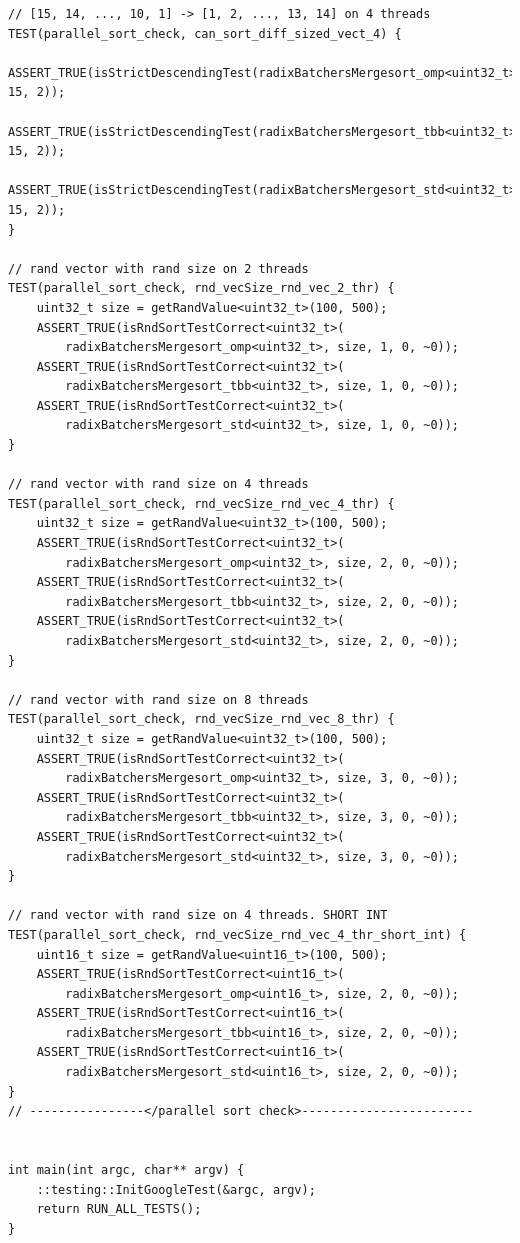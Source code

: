 \documentclass{report}
\begin{document}
\begin{lstlisting}
// [15, 14, ..., 10, 1] -> [1, 2, ..., 13, 14] on 4 threads
TEST(parallel_sort_check, can_sort_diff_sized_vect_4) {
    ASSERT_TRUE(isStrictDescendingTest(radixBatchersMergesort_omp<uint32_t>, 15, 2));
    ASSERT_TRUE(isStrictDescendingTest(radixBatchersMergesort_tbb<uint32_t>, 15, 2));
    ASSERT_TRUE(isStrictDescendingTest(radixBatchersMergesort_std<uint32_t>, 15, 2));
}

// rand vector with rand size on 2 threads
TEST(parallel_sort_check, rnd_vecSize_rnd_vec_2_thr) {
    uint32_t size = getRandValue<uint32_t>(100, 500);
    ASSERT_TRUE(isRndSortTestCorrect<uint32_t>(
        radixBatchersMergesort_omp<uint32_t>, size, 1, 0, ~0));
    ASSERT_TRUE(isRndSortTestCorrect<uint32_t>(
        radixBatchersMergesort_tbb<uint32_t>, size, 1, 0, ~0));
    ASSERT_TRUE(isRndSortTestCorrect<uint32_t>(
        radixBatchersMergesort_std<uint32_t>, size, 1, 0, ~0));
}

// rand vector with rand size on 4 threads
TEST(parallel_sort_check, rnd_vecSize_rnd_vec_4_thr) {
    uint32_t size = getRandValue<uint32_t>(100, 500);
    ASSERT_TRUE(isRndSortTestCorrect<uint32_t>(
        radixBatchersMergesort_omp<uint32_t>, size, 2, 0, ~0));
    ASSERT_TRUE(isRndSortTestCorrect<uint32_t>(
        radixBatchersMergesort_tbb<uint32_t>, size, 2, 0, ~0));
    ASSERT_TRUE(isRndSortTestCorrect<uint32_t>(
        radixBatchersMergesort_std<uint32_t>, size, 2, 0, ~0));
}

// rand vector with rand size on 8 threads
TEST(parallel_sort_check, rnd_vecSize_rnd_vec_8_thr) {
    uint32_t size = getRandValue<uint32_t>(100, 500);
    ASSERT_TRUE(isRndSortTestCorrect<uint32_t>(
        radixBatchersMergesort_omp<uint32_t>, size, 3, 0, ~0));
    ASSERT_TRUE(isRndSortTestCorrect<uint32_t>(
        radixBatchersMergesort_tbb<uint32_t>, size, 3, 0, ~0));
    ASSERT_TRUE(isRndSortTestCorrect<uint32_t>(
        radixBatchersMergesort_std<uint32_t>, size, 3, 0, ~0));
}

// rand vector with rand size on 4 threads. SHORT INT
TEST(parallel_sort_check, rnd_vecSize_rnd_vec_4_thr_short_int) {
    uint16_t size = getRandValue<uint16_t>(100, 500);
    ASSERT_TRUE(isRndSortTestCorrect<uint16_t>(
        radixBatchersMergesort_omp<uint16_t>, size, 2, 0, ~0));
    ASSERT_TRUE(isRndSortTestCorrect<uint16_t>(
        radixBatchersMergesort_tbb<uint16_t>, size, 2, 0, ~0));
    ASSERT_TRUE(isRndSortTestCorrect<uint16_t>(
        radixBatchersMergesort_std<uint16_t>, size, 2, 0, ~0));
}
// ----------------</parallel sort check>------------------------


int main(int argc, char** argv) {
    ::testing::InitGoogleTest(&argc, argv);
    return RUN_ALL_TESTS();
}
\end{lstlisting}
\end{document}
